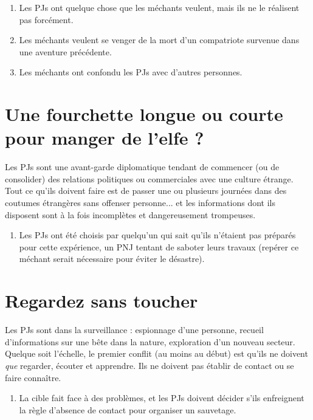\begin{multicols}{2}
\themes
\begin{enumerate}
\item Les PJs ont quelque chose que les méchants veulent, mais ils ne le réalisent pas forcément.
\item Les méchants veulent se venger de la mort d'un compatriote survenue dans une aventure précédente.
\item Les méchants ont confondu les PJs avec d'autres personnes.
\end{enumerate}

\section{Une fourchette longue ou courte pour manger de l'elfe ?}
\hypertarget{elfe}{}


Les PJs sont une avant-garde diplomatique tendant de commencer (ou de consolider) des relations politiques ou commerciales avec une culture étrange. Tout ce qu'ils doivent faire est de passer une ou plusieurs journées dans des coutumes étrangères sans offenser personne... et les informations dont ils disposent sont à la fois incomplètes et dangereusement trompeuses.

\themes
\begin{enumerate}
\item Les PJs ont été choisis par quelqu'un qui sait qu'ils n'étaient pas préparés pour cette expérience, un PNJ tentant de saboter leurs travaux (repérer ce méchant serait nécessaire pour éviter le désastre).
\end{enumerate}

\section{Regardez sans toucher}
\hypertarget{regardez}{}


Les PJs sont dans la surveillance : espionnage d'une personne, recueil d'informations sur une bête dans la nature, exploration d'un nouveau secteur. Quelque soit l'échelle, le premier conflit (au moins au début) est qu'ils ne doivent \textit{que} regarder, écouter et apprendre. Ils ne doivent pas établir de contact ou se faire connaître.

\themes
\begin{enumerate}
\item La cible fait face à des problèmes, et les PJs doivent décider s'ils enfreignent la règle d'absence de contact pour organiser un sauvetage.
\end{enumerate}


\end{multicols}
